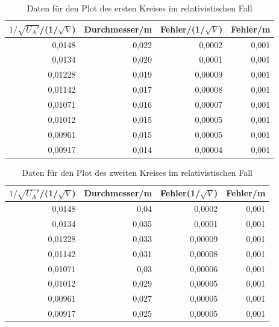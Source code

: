 \documentclass[12pt,a4paper]{article}
\begin{document}
\begin{table}[H]
\caption{Daten für den Plot des ersten Kreises im relativistischen Fall}
\begin{center}
\begin{tabular}{|r|r|r|r|}
\hline
\multicolumn{1}{|l|}{$1/\sqrt{U_A'}$/(1/$\sqrt{V}$)} & \multicolumn{1}{l|}{Durchmesser/m} & \multicolumn{1}{l|}{Fehler/(1/$\sqrt{V}$)} & \multicolumn{1}{l|}{Fehler/m} \\ \hline
0,0148 & 0,022 & 0,0002 & 0,001 \\ \hline
0,0134 & 0,020 & 0,0001 & 0,001 \\ \hline
0,01228 & 0,019 & 0,00009 & 0,001 \\ \hline
0,01142 & 0,017 & 0,00008 & 0,001 \\ \hline
0,01071 & 0,016 & 0,00007 & 0,001 \\ \hline
0,01012 & 0,015 & 0,00005 & 0,001 \\ \hline
0,00961 & 0,015 & 0,00005 & 0,001 \\ \hline
0,00917 & 0,014 & 0,00004 & 0,001 \\ \hline
\end{tabular}
\end{center}
\label{tab:p_1_r}
\end{table}

\begin{table}[H]
\caption{Daten für den Plot des zweiten Kreises im relativistischen Fall}
\begin{center}
\begin{tabular}{|r|r|r|r|}
\hline
\multicolumn{1}{|l|}{$1/\sqrt{U_A'}$/(1/$\sqrt{V}$)} & \multicolumn{1}{l|}{Durchmesser/m} & \multicolumn{1}{l|}{Fehler(1/$\sqrt{V}$)} & \multicolumn{1}{l|}{Fehler/m} \\ \hline
0,0148 & 0,04 & 0,0002 & 0,001 \\ \hline
0,0134 & 0,035 & 0,0001 & 0,001 \\ \hline
0,01228 & 0,033 & 0,00009 & 0,001 \\ \hline
0,01142 & 0,031 & 0,00008 & 0,001 \\ \hline
0,01071 & 0,03 & 0,00006 & 0,001 \\ \hline
0,01012 & 0,029 & 0,00005 & 0,001 \\ \hline
0,00961 & 0,027 & 0,00005 & 0,001 \\ \hline
0,00917 & 0,025 & 0,00005 & 0,001 \\ \hline
\end{tabular}
\end{center}
\label{tab:p_2_r}
\end{table}
\newpage
\end{document}
